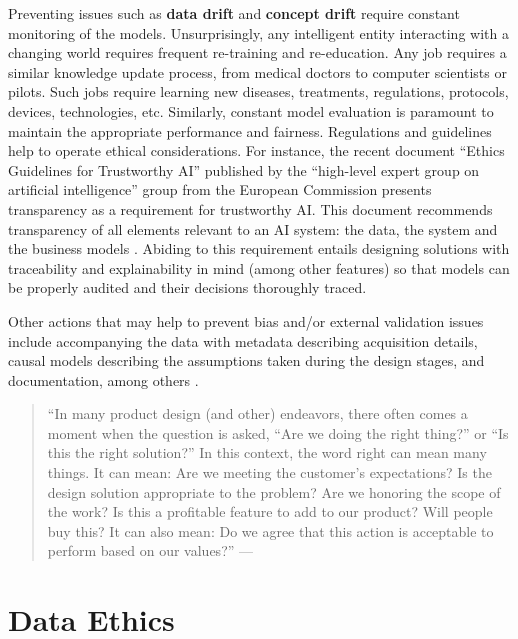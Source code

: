 \documentclass[
  12pt,
]{book}
\begin{document}
Preventing issues such as \textbf{data drift} and \textbf{concept drift} require constant monitoring of the models. Unsurprisingly, any intelligent entity interacting with a changing world requires frequent re-training and re-education. Any job requires a similar knowledge update process, from medical doctors to computer scientists or pilots. Such jobs require learning new diseases, treatments, regulations, protocols, devices, technologies, etc. Similarly, constant model evaluation is paramount to maintain the appropriate performance and fairness. Regulations and guidelines help to operate ethical considerations. For instance, the recent document ``Ethics Guidelines for Trustworthy AI'' published by the ``high-level expert group on artificial intelligence'' group from the European Commission presents transparency as a requirement for trustworthy AI. This document recommends transparency of all elements relevant to an AI system: the data, the system and the business models \citep{ai2019high}. Abiding to this requirement entails designing solutions with traceability and explainability in mind (among other features) so that models can be properly audited and their decisions thoroughly traced.

Other actions that may help to prevent bias and/or external validation issues include accompanying the data with metadata describing acquisition details, causal models describing the assumptions taken during the design stages, and documentation, among others \citep{garcia2021need}.

\begin{quote}
``In many product design (and other) endeavors, there often comes a moment when the question is asked, ``Are we doing the right thing?'' or ``Is this the right solution?'' In this context, the word right can mean many things. It can mean: Are we meeting the customer's expectations? Is the design solution appropriate to the problem? Are we honoring the scope of the work? Is this a profitable feature to add to our product? Will people buy this? It can also mean: Do we agree that this action is acceptable to perform based on our values?'' --- \citep{davis2012ethics}
\end{quote}

\section{Data Ethics}\label{data-ethics}
\end{document}
